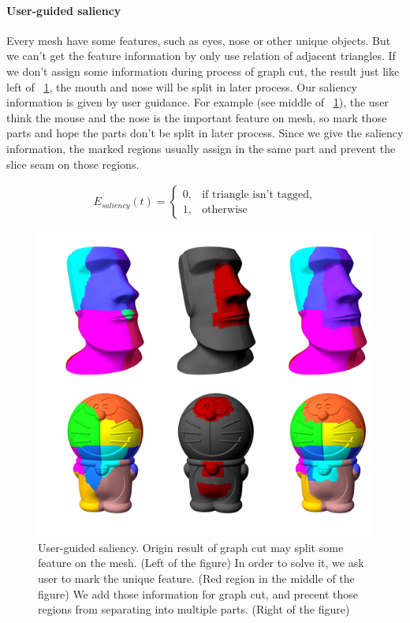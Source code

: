 \paragraph{User-guided saliency} 
Every mesh have some features, such as eyes, nose or other unique objects. But we can't get the feature information by only use relation of adjacent triangles. If we don't assign some information during process of graph cut, the result just like left of \figname~\ref{fig:saliency}, the mouth and nose will be split in later process. Our saliency information is given by user guidance. For example (see middle of \figname~\ref{fig:saliency}), the user think the mouse and the nose is the important feature on mesh, so mark those parts and hope the parts don't be split in later process. Since we give the saliency information, the marked regions usually assign in the same part and prevent the slice seam on those regions.

\begin{align}
E_{saliency}(t) = 
\begin{cases}
0, & \text{if triangle isn't tagged}, \\
1, & \text{otherwise} 
\end{cases}
\end{align}

\begin{figure}[ht]
\centering
\includegraphics[width=1.0\linewidth]{figs/saliency.pdf} 
\caption{User-guided saliency. Origin result of graph cut may split some feature on the mesh. (Left of the figure) In order to solve it, we ask user to mark the unique feature. (Red region in the middle of the figure) We add those information for graph cut, and precent those regions from separating into multiple parts. (Right of the figure)} 
\label{fig:saliency}
\end{figure}

